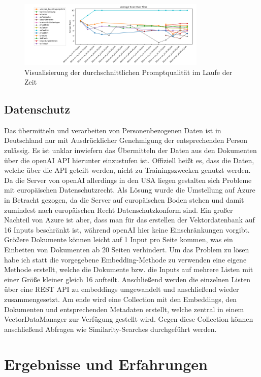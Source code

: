 \begin{figure}[H]
    \centering
    \includegraphics[width=0.8\textwidth]{figures/03_Prompt_Evaluierung.png}
    \caption{Visualisierung der durchschnittlichen Promptqualität im Laufe der Zeit}
    \label{fig:03_Prompt_Evaluierung}    %
    \end{figure}

\subsection{Datenschutz}
Das übermitteln und verarbeiten von Personenbezogenen Daten ist in Deutschland nur mit Ausdrücklicher Genehmigung der 
entsprechenden Person zulässig. Es ist unklar inwiefern das Übermitteln der Daten aus den Dokumenten über die openAI 
API hierunter einzustufen ist. Offiziell heißt es, dass die Daten, welche über die API geteilt werden, nicht zu 
Trainingszwecken genutzt werden. Da die Server von openAI allerdings in den USA liegen gestalten sich Probleme mit 
europäischen Datenschutzrecht. Als Lösung wurde die Umstellung auf Azure in Betracht gezogen, da die Server auf europäischen 
Boden stehen und damit zumindest nach europäischen Recht Datenschutzkonform sind. Ein großer Nachteil von Azure ist aber, 
dass man für das erstellen der Vektordatenbank auf 16 Inputs beschränkt ist, während openAI hier keine Einschränkungen vorgibt. 
Größere Dokumente können leicht auf 1 Input pro Seite kommen, was ein Einbetten von Dokumenten ab 20 Seiten verhindert.
Um das Problem zu lösen habe ich statt die vorgegebene Embedding-Methode zu verwenden eine eigene Methode erstellt, 
welche die Dokumente bzw. die Inputs auf mehrere Listen mit einer Größe kleiner gleich 16 aufteilt. Anschließend werden 
die einzelnen Listen über eine REST API zu embeddings umgewandelt und anschließend wieder zusammengesetzt. Am ende wird eine 
Collection mit den Embeddings, den Dokumenten und entsprechenden Metadaten erstellt, welche zentral in einem VectorDataManager 
zur Verfügung gestellt wird. Gegen diese Collection können anschließend Abfragen wie Similarity-Searches durchgeführt werden.

\section{Ergebnisse und Erfahrungen}